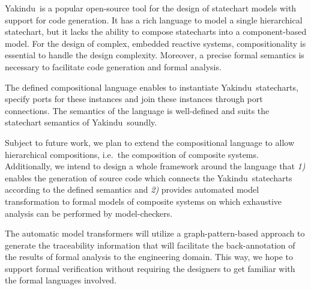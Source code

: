 \documentclass[conference]{IEEEtran}
\newcommand{\Yakindu}{\textsf{Yakindu}}
\begin{document}
\Yakindu\ is a popular open-source tool for the design of statechart models with support for code generation. It has a rich language to model a single hierarchical statechart, but it lacks the ability to compose statecharts into a component-based model. For the design of complex, embedded reactive systems, compositionality is essential to handle the design complexity. Moreover, a precise formal semantics is necessary to facilitate code generation and formal analysis.

The defined compositional language enables to instantiate \Yakindu\ statecharts, specify ports for these instances and join these instances through port connections. The semantics of the language is well-defined and suits the statechart semantics of \Yakindu\ soundly.


Subject to future work, we plan to extend the compositional language to allow hierarchical compositions, i.e.~the composition of composite systems. Additionally, we intend to design a whole framework around the language that \textit{1)} enables the generation of source code which connects the \Yakindu\ statecharts according to the defined semantics and \textit{2)} provides automated model transformation to formal models of composite systems on which exhaustive analysis can be performed by model-checkers.

The automatic model transformers will utilize a graph-pattern-based approach to generate the traceability information that will facilitate the back-annotation of the results of formal analysis to the engineering domain. This way, we hope to support formal verification without requiring the designers to get familiar with the formal languages involved.

%
%
\end{document}

